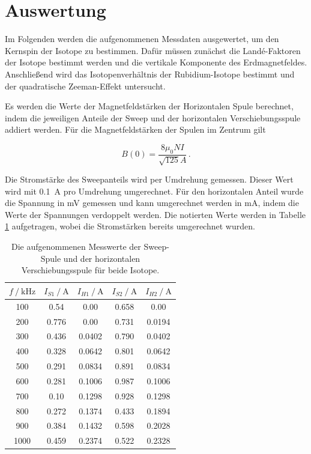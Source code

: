 \section{Auswertung}
\label{sec:auswertung}

Im Folgenden werden die aufgenommenen Messdaten ausgewertet, um den Kernspin der Isotope zu bestimmen.
Dafür müssen zunächst die Landé-Faktoren der Isotope bestimmt werden und die vertikale Komponente des Erdmagnetfeldes.
Anschließend wird das Isotopenverhältnis der Rubidium-Isotope bestimmt und der quadratische Zeeman-Effekt untersucht.

Es werden die Werte der Magnetfeldstärken der Horizontalen Spule berechnet, indem die jeweiligen Anteile der Sweep und der
horizontalen Verschiebungsspule addiert werden.
Für die Magnetfeldstärken der Spulen im Zentrum gilt

\begin{equation}
    B(0) = \frac{8  \mu_0  N I}{\sqrt{125} A}  \, .
    \label{eqn:magnetfeld}
\end{equation}

Die Stromstärke des Sweepanteils wird per Umdrehung gemessen.
Dieser Wert wird mit \qty{0.1}{\ampere} pro Umdrehung umgerechnet.
Für den horizontalen Anteil wurde die Spannung in \unit{\milli\volt} gemessen und kann umgerechnet werden in \unit{\milli\ampere},
indem die Werte der Spannungen verdoppelt werden.
Die notierten Werte werden in Tabelle \ref{tab:magnetfeldstärken} aufgetragen, wobei die Stromstärken bereits umgerechnet wurden.

\begin{table}
    \centering
    \caption{Die aufgenommenen Messwerte der Sweep-Spule und der horizontalen Verschiebungsspule für beide Isotope.}
    \label{tab:magnetfeldstärken}
    \begin{tabular}{c c c c c}
        \toprule
        $f \mathbin{/} \mathrm{kHz} $& $I_{S1} \mathbin{/} \unit{\ampere}$ & $I_{H1} \mathbin{/} \unit{\ampere}$ & $I_{S2} \mathbin{/} \unit{\ampere}$ & $I_{H2} \mathbin{/} \unit{\ampere}$ \\
        \midrule
        100 & 0.54 & 0.00 & 0.658 & 0.00 \\
        200 & 0.776 & 0.00 & 0.731 & 0.0194 \\
        300 & 0.436 & 0.0402 & 0.790 & 0.0402 \\
        400 & 0.328 & 0.0642 & 0.801 & 0.0642 \\
        500 & 0.291 & 0.0834 & 0.891 & 0.0834 \\
        600 & 0.281 & 0.1006 & 0.987 & 0.1006 \\
        700 & 0.10 & 0.1298 & 0.928 & 0.1298 \\
        800 & 0.272 & 0.1374 & 0.433 & 0.1894 \\
        900 & 0.384 & 0.1432 & 0.598 & 0.2028 \\
        1000 & 0.459 & 0.2374 & 0.522 & 0.2328 \\
        \bottomrule
    \end{tabular}
\end{table}

